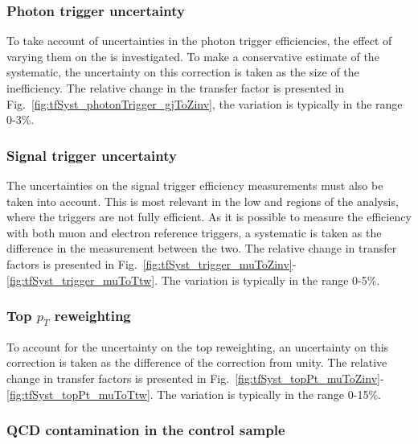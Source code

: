 %
\subsubsection*{Photon trigger uncertainty}
\label{sec:tfSyst_photonTrigger}

To take account of uncertainties in the photon trigger efficiencies, the
effect of varying them on the \gj \TF is investigated. To make a
conservative estimate of the systematic, the uncertainty on this
correction is taken as the size of the inefficiency. The relative
change in the \gj transfer factor is presented in
Fig.~\ref{fig:tfSyst_photonTrigger_gjToZinv}, the variation is typically in
the range 0-3\%.

\subsubsection*{Signal trigger uncertainty}
\label{sec:tfSyst_trigger}

The uncertainties on the signal trigger efficiency
measurements must also be taken into account. This is most relevant in the low
\HT and \MHT regions of the analysis, where the triggers are not fully
efficient. As it is possible to measure the efficiency with both muon
and electron reference triggers, a systematic is taken as the
difference in the measurement between the two.  The relative change in
transfer factors is presented in Fig.~\ref{fig:tfSyst_trigger_muToZinv}-\ref{fig:tfSyst_trigger_muToTtw}.
The variation is typically in the range 0-5\%.

\subsubsection*{Top $p_T$ reweighting}
\label{sec:tfSyst_topPt}

To account for the uncertainty on the top \pT reweighting, an 
uncertainty on this correction is taken as the difference of the
correction from unity. The relative change in transfer factors is
presented in Fig.~\ref{fig:tfSyst_topPt_muToZinv}-\ref{fig:tfSyst_topPt_muToTtw}. The
variation is typically in the range 0-15\%.

\subsubsection*{QCD contamination in the \gj control sample}
\label{sec:tfSyst_qcdCont}

